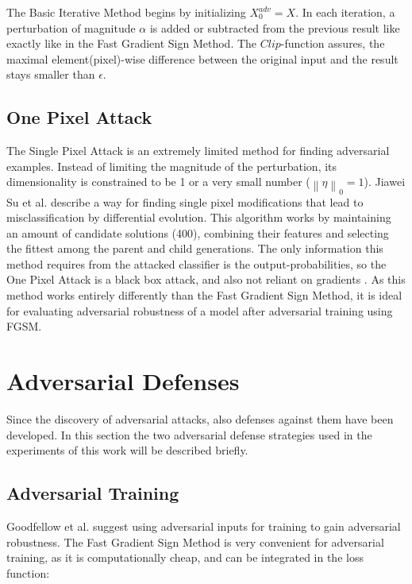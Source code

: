 \documentclass[draft,final]{vutinfth} %
\newcommand{\norm}[1]{\left\lVert#1\right\rVert}
\begin{document}
The Basic Iterative Method begins by initializing $X^{adv}_0 = X$.
In each iteration, a perturbation of magnitude $\alpha$ is added or subtracted from the previous result like exactly like in the Fast Gradient Sign Method.
The $Clip$-function assures, the maximal element(pixel)-wise difference between the original input and the result stays smaller than $\epsilon$.

\cite{Kurakin2016}

\subsection{One Pixel Attack}

The Single Pixel Attack is an extremely limited method for finding adversarial examples.
Instead of limiting the magnitude of the perturbation, its dimensionality is constrained to be 1 or a very small number ($\norm{\eta}_0=1$).
Jiawei Su et al. describe a way for finding single pixel modifications that lead to misclassification by differential evolution.
This algorithm works by maintaining an amount of candidate solutions (400), combining their features and selecting the fittest among the parent and child generations.
The only information this method requires from the attacked classifier is the output-probabilities, so the One Pixel Attack is a black box attack, and also not reliant on gradients \cite{Jiawei2017}.
As this method works entirely differently than the Fast Gradient Sign Method, it is ideal for evaluating adversarial robustness of a model after adversarial training using FGSM.

\section{Adversarial Defenses}

Since the discovery of adversarial attacks, also defenses against them have been developed.
In this section the two adversarial defense strategies used in the experiments of this work will be described briefly.

\subsection{Adversarial Training}

Goodfellow et al. suggest using adversarial inputs for training to gain adversarial robustness.
The Fast Gradient Sign Method is very convenient for adversarial training, as it is computationally cheap, and can be integrated in the loss function:
\end{document}
